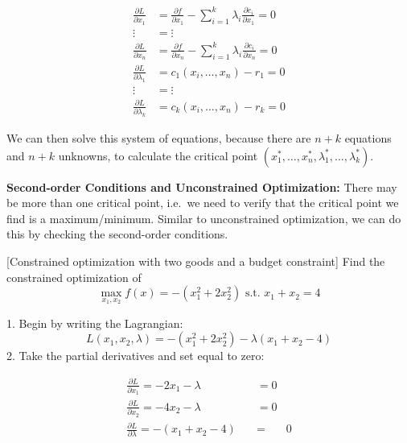 \documentclass[]{book}
\theoremstyle{definition}
\theoremstyle{definition}
\theoremstyle{definition}
\theoremstyle{remark}
\begin{document}
\begin{align*}
\frac{\partial L}{\partial x_1} &= \frac{\partial f}{\partial x_1} - \sum_{i = 1}^k\lambda_i\frac{\partial c_i}{\partial x_1} = 0\\
 \vdots &= \vdots \nonumber \\ 
\frac{\partial L}{\partial x_n}  &= \frac{\partial f}{\partial x_n} - \sum_{i = 1}^k\lambda_i\frac{\partial c_i}{\partial x_n} = 0\\
\frac{\partial L}{\partial \lambda_1} &= c_1(x_i, \dots, x_n) - r_1 =  0\\
 \vdots &= \vdots \nonumber \\
\frac{\partial L}{\partial \lambda_k} &= c_k(x_i, \dots, x_n) - r_k = 0
\end{align*}

We can then solve this system of equations, because there are \(n+k\) equations and \(n+k\) unknowns, to calculate the critical point \((x_1^*,\dots,x_n^*,\lambda_1^*,\dots,\lambda_k^*)\).

\textbf{Second-order Conditions and Unconstrained Optimization:} There may be more than one critical point, i.e.~we need to verify that the critical point we find is a maximum/minimum. Similar to unconstrained optimization, we can do this by checking the second-order conditions.

[Constrained optimization with two goods and a budget constraint]
\protect\hypertarget{exm:unnamed-chunk-60}{}{\label{exm:unnamed-chunk-60} {} }
Find the constrained optimization of
\[\max_{x_1,x_2} f(x) = -(x_1^2 + 2x_2^2) \text{ s.t. } x_1 + x_2 = 4\]

{}
1. Begin by writing the Lagrangian:
\[L(x_1, x_2, \lambda) =  -(x_1^2 + 2x_2^2) - \lambda(x_1 + x_2 - 4)\]
2. Take the partial derivatives and set equal to zero:

\begin{align*}
\frac{\partial L}{\partial x_1} = -2x_1 - \lambda \quad \quad \quad &= 0\\
\frac{\partial L}{\partial x_2}  = -4x_2 - \lambda \quad \quad \quad &= 0\\
\frac{\partial L}{\partial \lambda} = -(x_1 + x_2 - 4) \quad & = & 0\\
\end{align*}
\end{document}
